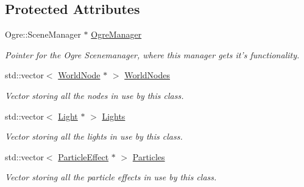\subsection*{Protected Attributes}
\begin{DoxyCompactItemize}
\item 
\hypertarget{classphys_1_1SceneManager_ab9980c42506a8757cab12feb210f056a}{
Ogre::SceneManager $\ast$ \hyperlink{classphys_1_1SceneManager_ab9980c42506a8757cab12feb210f056a}{OgreManager}}
\label{dd/da8/classphys_1_1SceneManager_ab9980c42506a8757cab12feb210f056a}

\begin{DoxyCompactList}\small\item\em Pointer for the Ogre Scenemanager, where this manager gets it's functionality. \item\end{DoxyCompactList}\item 
\hypertarget{classphys_1_1SceneManager_a51a391281cc074801792599ae38638b0}{
std::vector$<$ \hyperlink{classphys_1_1WorldNode}{WorldNode} $\ast$ $>$ \hyperlink{classphys_1_1SceneManager_a51a391281cc074801792599ae38638b0}{WorldNodes}}
\label{dd/da8/classphys_1_1SceneManager_a51a391281cc074801792599ae38638b0}

\begin{DoxyCompactList}\small\item\em Vector storing all the nodes in use by this class. \item\end{DoxyCompactList}\item 
\hypertarget{classphys_1_1SceneManager_a196c70361e8db0d5861cfb7b35f1bbf3}{
std::vector$<$ \hyperlink{classphys_1_1Light}{Light} $\ast$ $>$ \hyperlink{classphys_1_1SceneManager_a196c70361e8db0d5861cfb7b35f1bbf3}{Lights}}
\label{dd/da8/classphys_1_1SceneManager_a196c70361e8db0d5861cfb7b35f1bbf3}

\begin{DoxyCompactList}\small\item\em Vector storing all the lights in use by this class. \item\end{DoxyCompactList}\item 
\hypertarget{classphys_1_1SceneManager_a45f2d2029642d668c1e15a914eac7d1b}{
std::vector$<$ \hyperlink{classphys_1_1ParticleEffect}{ParticleEffect} $\ast$ $>$ \hyperlink{classphys_1_1SceneManager_a45f2d2029642d668c1e15a914eac7d1b}{Particles}}
\label{dd/da8/classphys_1_1SceneManager_a45f2d2029642d668c1e15a914eac7d1b}

\begin{DoxyCompactList}\small\item\em Vector storing all the particle effects in use by this class. \item\end{DoxyCompactList}\end{DoxyCompactItemize}


